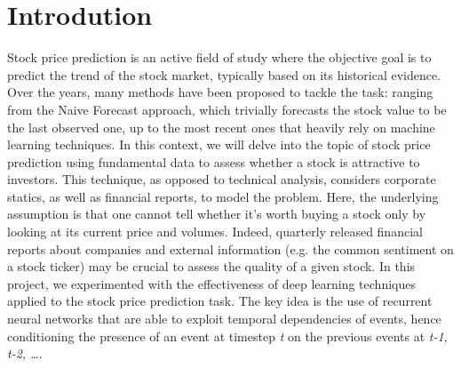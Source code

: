\documentclass{article}
\begin{document}

\printAffiliationsAndNotice{}

%
%

\section{Introdution}

Stock price prediction is an active field of study where the objective goal is to predict the trend of the stock market, typically based on its historical evidence. Over the years, many methods have been proposed to tackle the task: ranging from the Naive Forecast approach, which trivially forecasts the stock value to be the last observed one, up to the most recent ones that heavily rely on machine learning techniques. In this context, we will delve into the topic of stock price prediction using fundamental data to assess whether a stock is attractive to investors. 
This technique, as opposed to technical analysis, considers corporate statics, as well as financial reports, to model the problem. Here, the underlying assumption is that one cannot tell whether it's worth buying a stock only by looking at its current price and volumes. Indeed, quarterly released financial reports about companies and external information (e.g. the common sentiment on a stock ticker) may be crucial to assess the quality of a given stock. In this project, we experimented with the effectiveness of deep learning techniques applied to the stock price prediction task. The key idea is the use of recurrent neural networks that are able to exploit temporal dependencies of events, hence conditioning the presence of an event at timestep \emph{t} on the previous events at \emph{t-1, t-2, \ldots}. 
\end{document}
